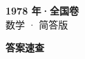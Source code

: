 \documentclass[zihao=-4, a4paper]{ctexart}
\begin{document}
\begin{center}
  {\Large\bfseries 1978 年·全国卷}\\[4pt]
  {\large 数学 · 简答版}
\end{center}
\medskip
{}

\clearpage
{}
\begin{center}{\Large\bfseries 答案速查}\end{center}
\medskip

\end{document}
